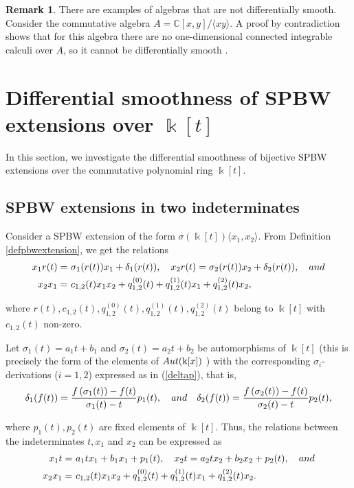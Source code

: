 \documentclass{amsart}
\theoremstyle{definition}
\newtheorem{remark}[theorem]{Remark}
\theoremstyle{remark}
\numberwithin{equation}{section}
\begin{document}
\begin{remark}
There are examples of algebras that are not differentially smooth. Consider the commutative algebra $A = \mathbb{C}[x, y] / \langle xy \rangle$. A proof by contradiction shows that for this algebra there are no one-dimensional connected integrable calculi over $A$, so it cannot be differentially smooth \cite[Example 2.5]{BrzezinskiSitarz2017}.
\end{remark}


\section{Differential smoothness of SPBW extensions over \texorpdfstring{$\Bbbk[t]$}{Lg}}\label{DICSPBWKt}

In this section, we investigate the differential smoothness of bijective SPBW extensions over the commutative polynomial ring $\Bbbk[t]$. 


\subsection{SPBW extensions in two indeterminates}\label{SPBWTMTwoI}

Consider a SPBW extension of the form $\sigma(\Bbbk[t]) \langle x_1, x_2\rangle$. From Definition \ref{defpbwextension}, we get the relations 
\begin{align*}
    x_1r(t) = &\ \sigma_1(r(t)) x_1 + \delta_1(r(t)),\quad x_2 r(t) =  \sigma_2(r(t)) x_2 + \delta_2(r(t)), \quad {\rm and} \\
    x_2 x_1 = &\ c_{1, 2}(t)x_1 x_2 + q_{1,2}^{(0)}(t) + q_{1,2}^{(1)}(t)x_1 + q_{1,2}^{(2)}(t)x_2, 
\end{align*}

where $r(t), c_{1, 2}(t), q_{1, 2}^{(0)}(t), q_{1, 2}^{(1)}(t), q_{1, 2}^{(2)}(t)$ belong to $\Bbbk[t]$ with $c_{1,2}(t)$ non-zero.

Let $\sigma_1(t) = a_1t+b_1$ and $\sigma_2(t)=a_2t+b_2$ be automorphisms of $\Bbbk[t]$ (this is precisely the form of the elements of ${\rm Aut}(\Bbbk[x])$ \cite{ShestakovUmirbaev2003, VandenEssen2000}) with the corresponding $\sigma_i$-derivations ($i =  1, 2$) expressed as in (\ref{deltap}), that is,
\[
 \delta_1(f(t)) = \frac{f\left(\sigma_{1}(t)\right)-f(t)}{\sigma_{1}(t)-t}p_1(t), \quad {\rm and} \quad \delta_2(f(t)) = \frac{f\left(\sigma_{2}(t)\right)-f(t)}{\sigma_{2}(t)-t}p_2(t),
\]

where $p_1(t), p_2(t)$ are fixed elements of $\Bbbk[t]$. Thus, the relations between the indeterminates $t, x_1$ and $x_2$ can be expressed as
\begin{align}
    x_1t = &\ a_1tx_1 + b_1x_1+ p_1(t), \quad x_2t = a_2tx_2 + b_2x_2+ p_2(t), \quad {\rm and} \label{relPBW3.1} \\
    x_2 x_1 = &\ c_{1, 2}(t)x_1 x_2 + q_{1,2}^{(0)}(t) + q_{1,2}^{(1)}(t)x_1 + q_{1,2}^{(2)}(t)x_2. \label{relPBW3.3}
\end{align}
\end{document}
